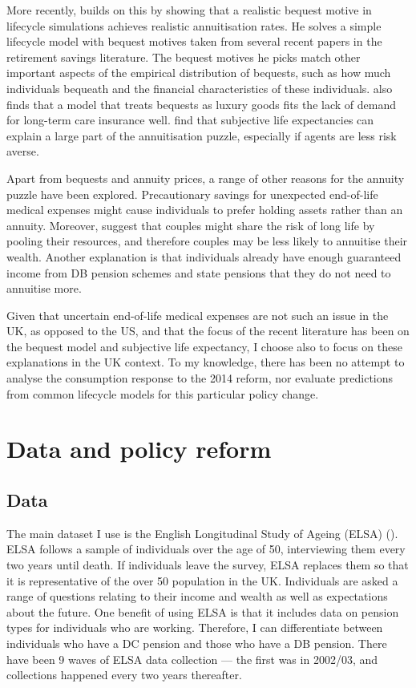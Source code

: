 \documentclass[12pt]{article}
\begin{document}
More recently, \cite{lockwood-red-2012} builds on this by showing that a
realistic bequest motive in lifecycle simulations achieves realistic
annuitisation rates. He solves a simple lifecycle model with bequest motives
taken from several recent papers in the retirement savings literature. The
bequest motives he picks match other important aspects of the empirical
distribution of bequests, such as how much individuals bequeath and the
financial characteristics of these individuals. \cite{lockwood-aer-2018} also
finds that a model that treats bequests as luxury goods fits the lack of demand
for long-term care insurance well. \cite{odea-sturrock-rest-2023} find that
subjective life expectancies can explain a large part of the annuitisation
puzzle, especially if agents are less risk averse.

Apart from bequests and annuity prices, a range of other reasons for the annuity
puzzle have been explored. Precautionary savings for unexpected end-of-life
medical expenses might cause individuals to prefer holding assets rather than
an annuity. Moreover, \cite{vidalmelia-lejarragagarcia-munich-2004} suggest
that couples might share the risk of long life by pooling their resources, and
therefore couples may be less likely to annuitise their wealth. Another
explanation is that individuals already have enough guaranteed income from DB
pension schemes and state pensions that they do not need to annuitise more.

Given that uncertain end-of-life medical expenses are not such an issue in the
UK, as opposed to the US, and that the focus of the recent literature has been
on the bequest model and subjective life expectancy, I choose also to focus on
these explanations in the UK context. To my knowledge, there has been no attempt
to analyse the consumption response to the 2014 reform, nor evaluate predictions
from common lifecycle models for this particular policy change.

\section{Data and policy reform}

\subsection{Data}

The main dataset I use is the English Longitudinal Study of Ageing (ELSA)
(\cite{main-elsa-citation}).
ELSA follows a sample of individuals over the age of 50, interviewing them every two years until death.
If individuals leave the survey, ELSA replaces them so that it is representative of the over 50 population in the UK.
Individuals are asked a range of questions relating to their income and wealth as well as
expectations about the future. One benefit of using ELSA is that it includes
data on pension types for individuals who are working. Therefore, I can
differentiate between individuals who have a DC pension and those who have a DB
pension. There have been 9 waves of ELSA data collection --- the first was in
2002/03, and collections happened every two years thereafter.
\end{document}
